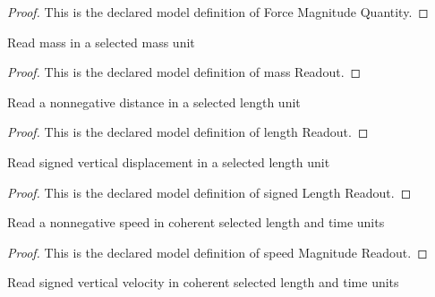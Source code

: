 \begin{proof}
  This is the declared model definition of Force Magnitude Quantity.
\end{proof}
\begin{definition}
  \label{def:physics:phyx-mini-0803:phyxminiproblems-problemphyxmini0803-massreadout}
  Read mass in a selected mass unit
\end{definition}
\begin{proof}
  This is the declared model definition of mass Readout.
\end{proof}
\begin{definition}
  \label{def:physics:phyx-mini-0803:phyxminiproblems-problemphyxmini0803-lengthreadout}
  Read a nonnegative distance in a selected length unit
\end{definition}
\begin{proof}
  This is the declared model definition of length Readout.
\end{proof}
\begin{definition}
  \label{def:physics:phyx-mini-0803:phyxminiproblems-problemphyxmini0803-signedlengthreadout}
  Read signed vertical displacement in a selected length unit
\end{definition}
\begin{proof}
  This is the declared model definition of signed Length Readout.
\end{proof}
\begin{definition}
  \label{def:physics:phyx-mini-0803:phyxminiproblems-problemphyxmini0803-speedmagnitudereadout}
  Read a nonnegative speed in coherent selected length and time units
\end{definition}
\begin{proof}
  This is the declared model definition of speed Magnitude Readout.
\end{proof}
\begin{definition}
  \label{def:physics:phyx-mini-0803:phyxminiproblems-problemphyxmini0803-signedspeedreadout}
  Read signed vertical velocity in coherent selected length and time units
\end{definition}

